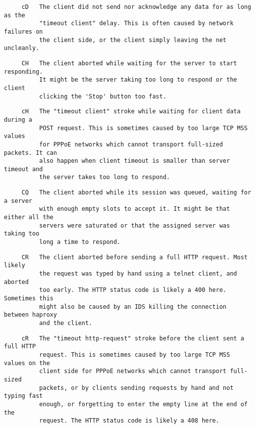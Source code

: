 \begin{verbatim}
     cD   The client did not send nor acknowledge any data for as long as the
          "timeout client" delay. This is often caused by network failures on
          the client side, or the client simply leaving the net uncleanly.
\end{verbatim}

\begin{verbatim}
     CH   The client aborted while waiting for the server to start responding.
          It might be the server taking too long to respond or the client
          clicking the 'Stop' button too fast.
\end{verbatim}

\begin{verbatim}
     cH   The "timeout client" stroke while waiting for client data during a
          POST request. This is sometimes caused by too large TCP MSS values
          for PPPoE networks which cannot transport full-sized packets. It can
          also happen when client timeout is smaller than server timeout and
          the server takes too long to respond.
\end{verbatim}

\begin{verbatim}
     CQ   The client aborted while its session was queued, waiting for a server
          with enough empty slots to accept it. It might be that either all the
          servers were saturated or that the assigned server was taking too
          long a time to respond.
\end{verbatim}

\begin{verbatim}
     CR   The client aborted before sending a full HTTP request. Most likely
          the request was typed by hand using a telnet client, and aborted
          too early. The HTTP status code is likely a 400 here. Sometimes this
          might also be caused by an IDS killing the connection between haproxy
          and the client.
\end{verbatim}

\begin{verbatim}
     cR   The "timeout http-request" stroke before the client sent a full HTTP
          request. This is sometimes caused by too large TCP MSS values on the
          client side for PPPoE networks which cannot transport full-sized
          packets, or by clients sending requests by hand and not typing fast
          enough, or forgetting to enter the empty line at the end of the
          request. The HTTP status code is likely a 408 here.
\end{verbatim}

